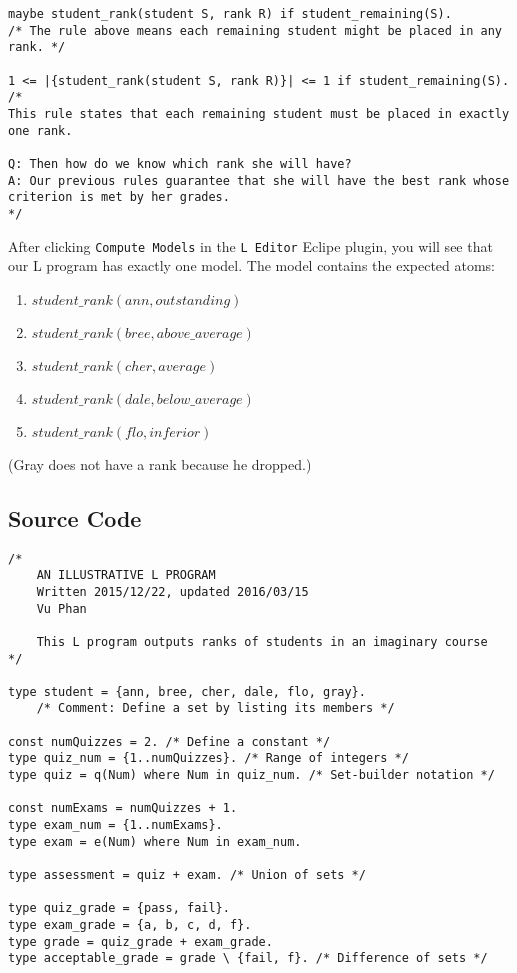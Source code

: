 \documentclass[letterpaper,10pt]{article}
\begin{document}
\begin{flushleft}
\begin{verbatim}
maybe student_rank(student S, rank R) if student_remaining(S).
/* The rule above means each remaining student might be placed in any rank. */

1 <= |{student_rank(student S, rank R)}| <= 1 if student_remaining(S).
/*
This rule states that each remaining student must be placed in exactly one rank.

Q: Then how do we know which rank she will have?
A: Our previous rules guarantee that she will have the best rank whose criterion is met by her grades.
*/
\end{verbatim}

After clicking \texttt{Compute Models} in the \texttt{L Editor} Eclipe plugin, you will see that our L program has exactly one model. The model contains the expected atoms:
\begin{enumerate}
\item
$student\_rank(ann,outstanding)$
\item
$student\_rank(bree,above\_average)$
\item
$student\_rank(cher,average)$
\item
$student\_rank(dale,below\_average)$
\item
$student\_rank(flo,inferior)$
\end{enumerate}
(Gray does not have a rank because he dropped.)

\pagebreak


\subsection{Source Code}
\begin{verbatim}
/*
    AN ILLUSTRATIVE L PROGRAM
    Written 2015/12/22, updated 2016/03/15
    Vu Phan

    This L program outputs ranks of students in an imaginary course
*/

type student = {ann, bree, cher, dale, flo, gray}. 
    /* Comment: Define a set by listing its members */

const numQuizzes = 2. /* Define a constant */
type quiz_num = {1..numQuizzes}. /* Range of integers */
type quiz = q(Num) where Num in quiz_num. /* Set-builder notation */

const numExams = numQuizzes + 1.
type exam_num = {1..numExams}.
type exam = e(Num) where Num in exam_num.

type assessment = quiz + exam. /* Union of sets */

type quiz_grade = {pass, fail}.
type exam_grade = {a, b, c, d, f}.
type grade = quiz_grade + exam_grade.
type acceptable_grade = grade \ {fail, f}. /* Difference of sets */


\end{verbatim}
\end{flushleft}
\end{document}
